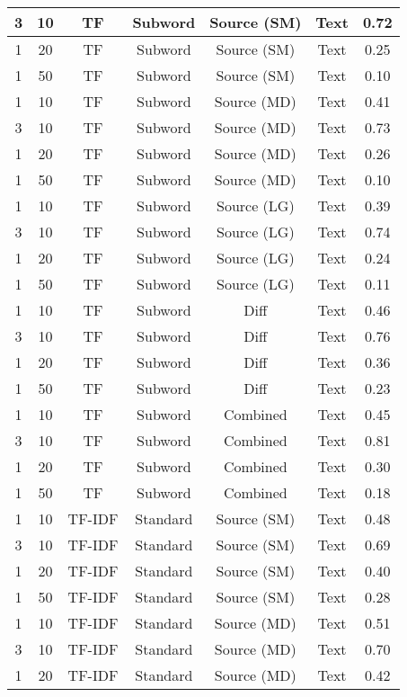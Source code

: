 \begin{longtable}{|c|c|c|c|c|c|c|}
\hline
3 & 10 & TF & Subword & Source (SM) & Text & 0.72 \\
\hline
1 & 20 & TF & Subword & Source (SM) & Text & 0.25 \\
\hline
1 & 50 & TF & Subword & Source (SM) & Text & 0.10 \\
\hline
1 & 10 & TF & Subword & Source (MD) & Text & 0.41 \\
\hline
3 & 10 & TF & Subword & Source (MD) & Text & 0.73 \\
\hline
1 & 20 & TF & Subword & Source (MD) & Text & 0.26 \\
\hline
1 & 50 & TF & Subword & Source (MD) & Text & 0.10 \\
\hline
1 & 10 & TF & Subword & Source (LG) & Text & 0.39 \\
\hline
3 & 10 & TF & Subword & Source (LG) & Text & 0.74 \\
\hline
1 & 20 & TF & Subword & Source (LG) & Text & 0.24 \\
\hline
1 & 50 & TF & Subword & Source (LG) & Text & 0.11 \\
\hline
1 & 10 & TF & Subword & Diff & Text & 0.46 \\
\hline
3 & 10 & TF & Subword & Diff & Text & 0.76 \\
\hline
1 & 20 & TF & Subword & Diff & Text & 0.36 \\
\hline
1 & 50 & TF & Subword & Diff & Text & 0.23 \\
\hline
1 & 10 & TF & Subword & Combined & Text & 0.45 \\
\hline
3 & 10 & TF & Subword & Combined & Text & 0.81 \\
\hline
1 & 20 & TF & Subword & Combined & Text & 0.30 \\
\hline
1 & 50 & TF & Subword & Combined & Text & 0.18 \\
\hline
1 & 10 & TF-IDF & Standard & Source (SM) & Text & 0.48 \\
\hline
3 & 10 & TF-IDF & Standard & Source (SM) & Text & 0.69 \\
\hline
1 & 20 & TF-IDF & Standard & Source (SM) & Text & 0.40 \\
\hline
1 & 50 & TF-IDF & Standard & Source (SM) & Text & 0.28 \\
\hline
1 & 10 & TF-IDF & Standard & Source (MD) & Text & 0.51 \\
\hline
3 & 10 & TF-IDF & Standard & Source (MD) & Text & 0.70 \\
\hline
1 & 20 & TF-IDF & Standard & Source (MD) & Text & 0.42 \\
\hline

\end{longtable}
